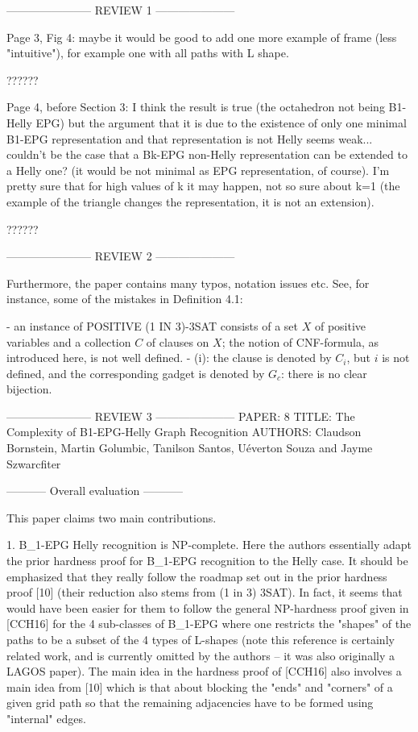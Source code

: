 ----------------------- REVIEW 1 ---------------------


Page 3, Fig 4: maybe it would be good to add one more example of frame (less "intuitive"), for example one with all paths with L shape.

??????

Page 4, before Section 3: I think the result is true (the octahedron not being B1-Helly EPG) but the argument that it is due to the existence of only one minimal B1-EPG representation and that representation is not Helly seems weak... couldn't be the case that a Bk-EPG non-Helly representation can be extended to a Helly one? (it would be not minimal as EPG representation, of course). I'm pretty sure that for high values of k it may happen, not so sure about k=1 (the example of the triangle changes the representation, it is not an extension).

??????

----------------------- REVIEW 2 ---------------------


Furthermore, the paper contains many typos, notation issues etc. See, for instance, some of the mistakes in Definition 4.1:

- an instance of POSITIVE (1 IN 3)-3SAT consists of a set $X$ of positive variables and a collection $C$ of clauses on $X$; the notion of CNF-formula, as introduced here, is not well defined.
- (i): the clause is denoted by $C_i$, but $i$ is not defined, and the corresponding gadget is denoted by $G_c$: there is no clear bijection.



----------------------- REVIEW 3 ---------------------
PAPER: 8
TITLE: The Complexity of B1-EPG-Helly Graph Recognition
AUTHORS: Claudson Bornstein, Martin Golumbic, Tanilson Santos, Uéverton Souza and Jayme Szwarcfiter


----------- Overall evaluation -----------

This paper claims two main contributions. 

1. B_1-EPG Helly recognition is NP-complete. Here the authors essentially adapt the prior hardness proof for B_1-EPG recognition to the Helly case. It should be emphasized that they really follow the roadmap set out in the prior hardness proof [10] (their reduction also stems from (1 in 3) 3SAT). In fact, it seems that would have been easier for them to follow the general NP-hardness proof given in [CCH16] for the 4 sub-classes of B_1-EPG where one restricts the "shapes" of the paths to be a subset of the 4 types of L-shapes (note this reference is certainly related work, and is currently omitted by the authors -- it was also originally a LAGOS paper). The main idea in the hardness proof of [CCH16] also involves a main idea from [10] which is that about blocking the "ends" and "corners" of a given grid path so that the remaining adjacencies have to be formed using "internal" edges. 

